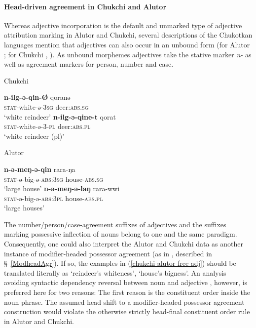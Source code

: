 \paragraph{Head-driven agreement in Chukchi and Alutor}
Whereas adjective incorporation is the default and unmarked type of adjective attribution marking in Alutor and Chukchi, several descriptions of the Chukotkan languages mention that adjectives can also occur in an unbound form (for Alutor \citealt{nagayama2003}; for Chukchi \citealt[103–104, 421–429]{skorik1960}, \citealt[251]{comrie1981}). As unbound morphemes adjectives take the stative marker \textit{n-} as well as agreement markers for person, number and case.
\begin{exe}
\ex \label{chukchi alutor free adj}
\begin{xlist}
\ex \rm{Chukchi \citep{skorik1960}}
\begin{xlist}
\ex
\gll	\textbf{n-ilg-ə-qin-Ø} qoranə\\
	\textsc{stat}-white-ə-\textsc{3sg} deer:\textsc{abs.sg}\\
\glt	‘white reindeer’
\ex
\gll	\textbf{n-ilg-ə-qine-t} qorat\\
	\textsc{stat}-white-ə-3-\textsc{pl} deer:\textsc{abs.pl}\\
\glt	‘white reindeer (pl)’
\end{xlist}
\ex \rm{Alutor \citep{nagayama2003}}
\begin{xlist}
\ex
\gll	\textbf{n-ə-meŋ-ə-qin} rara-ŋa\\
	\textsc{stat}-ə-big-ə-\textsc{abs:3sg} house-\textsc{abs.sg}\\
\glt	‘large house’
\ex
\gll	\textbf{n-ə-meŋ-ə-laŋ} rara-wwi\\
	\textsc{stat}-ə-big-ə-\textsc{abs:3pl} house-\textsc{abs.pl}\\
\glt	‘large houses’
\end{xlist}
\end{xlist}
\end{exe}
The number/person/case-agreement suffixes of adjectives and the suffixes marking possessive inflection of nouns belong to one and the same paradigm. Consequently, one could also interpret the Alutor and Chukchi data as another instance of modifier-headed possessor agreement (as in , described in \S~\ref{ModheadAgr}). If so, the examples in (\ref{chukchi alutor free adj}) should be translated literally as ‘reindeer's whiteness’, ‘house's bigness’. An analysis avoiding syntactic dependency reversal between noun and adjective \citep[cf.][]{malchukov2000a}, however, is preferred here for two reasons: The first reason is the constituent order inside the noun phrase. The assumed head shift to a modifier-headed possessor agreement construction would violate the otherwise strictly head-final constituent order rule in Alutor and Chukchi. 

